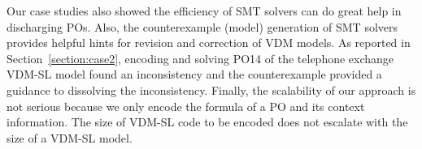 Our case studies also showed the efficiency of SMT solvers can do great help in discharging POs. Also, the counterexample (model) generation of SMT solvers provides helpful hints for revision and correction of VDM models. As reported in Section~\ref{section:case2}, encoding and solving PO14 of the telephone exchange VDM-SL model found an inconsistency and the counterexample provided a guidance to dissolving the inconsistency. Finally, the scalability of our approach is not serious because we only encode the formula of a PO and its context information. The size of VDM-SL code to be encoded does not escalate with the size of a VDM-SL model.



